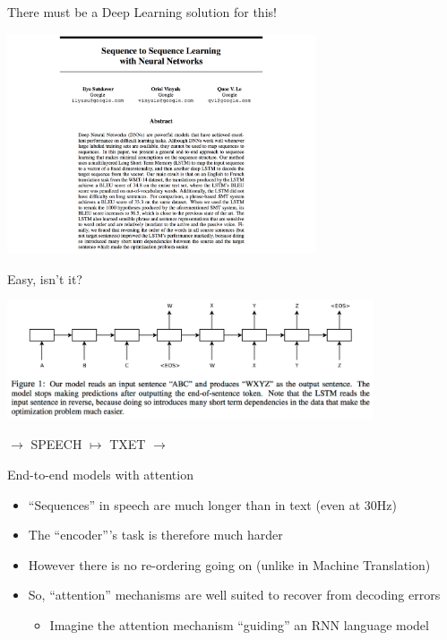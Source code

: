 \begin{frame}{There must be a Deep Learning solution for this!}
  \begin{center}
    \includegraphics[height=65mm]{figures/s2s}
  \end{center}
\end{frame}

\begin{frame}{Easy, isn't it?}
  \begin{center}
    \includegraphics[height=35mm]{figures/s2s-fig}
  \end{center}
\hspace{1.7cm} $\rightarrow$ SPEECH $\mapsto$ TXET $\rightarrow$
\end{frame}

\begin{frame}{End-to-end models with attention}
  \begin{itemize}
  \item ``Sequences'' in speech are much longer than in text (even at 30Hz)
  \item The ``encoder'''s task is therefore much harder
  \item However there is no re-ordering going on (unlike in Machine Translation)
  \item So, ``attention'' mechanisms are well suited to recover from decoding errors
    \begin{itemize}
    \item Imagine the attention mechanism ``guiding'' an RNN language model
    \end{itemize}
  \end{itemize}
\end{frame}

